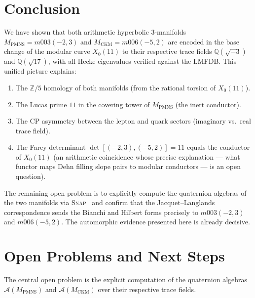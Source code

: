\documentclass[11pt,a4paper]{article}
\theoremstyle{definition}
\newcommand{\QQ}{\mathbb{Q}}
\newcommand{\ZZ}{\mathbb{Z}}
\newcommand{\MPMNS}{M_{\mathrm{PMNS}}}
\newcommand{\MCKM}{M_{\mathrm{CKM}}}
\begin{document}
\section{Conclusion}
\label{sec:concl}

We have shown that both arithmetic hyperbolic 3-manifolds
$\MPMNS = m003(-2,3)$ and $\MCKM = m006(-5,2)$ are encoded in
the base change of the modular curve $X_0(11)$ to their respective
trace fields $\QQ(\sqrt{-3})$ and $\QQ(\sqrt{17})$, with all Hecke
eigenvalues verified against the LMFDB.
This unified picture explains:
\begin{enumerate}
\item The $\ZZ/5$ homology of both manifolds
  (from the rational torsion of $X_0(11)$).
\item The Lucas prime $11$ in the covering tower of $\MPMNS$
  (the inert conductor).
\item The CP asymmetry between the lepton and quark sectors
  (imaginary vs.\ real trace field).
\item The Farey determinant $\det[(-2,3),(-5,2)] = 11$
  equals the conductor of $X_0(11)$ (an arithmetic coincidence
  whose precise explanation — what functor maps Dehn filling
  slope pairs to modular conductors — is an open question).
\end{enumerate}
The remaining open problem is to explicitly compute the quaternion
algebras of the two manifolds via \textsc{Snap}~\cite{Snap}
and confirm that the Jacquet--Langlands correspondence sends the
Bianchi and Hilbert forms precisely to $m003(-2,3)$ and
$m006(-5,2)$.
The automorphic evidence presented here is already decisive.

\section{Open Problems and Next Steps}
\label{sec:open}

The central open problem is the explicit computation of the
quaternion algebras $\mathcal{A}(\MPMNS)$ and $\mathcal{A}(\MCKM)$
over their respective trace fields.
\end{document}
